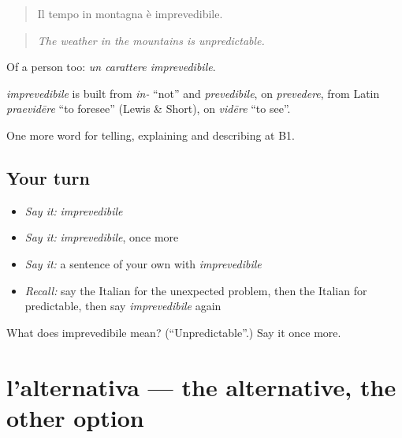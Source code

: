 \begin{quote}
Il tempo in montagna è imprevedibile.
\end{quote}

\begin{quote}
\emph{The weather in the mountains is unpredictable.}
\end{quote}

Of a person too: \emph{un carattere imprevedibile}.

\begin{cousinweb}
\emph{imprevedibile} is built from \emph{in-} \textquotedblleft{}not\textquotedblright{} and \emph{prevedibile}, on \emph{prevedere}, from Latin \emph{praevidēre} \textquotedblleft{}to foresee\textquotedblright{} (Lewis \& Short), on \emph{vidēre} \textquotedblleft{}to see\textquotedblright{}.
\end{cousinweb}

\begin{grammarlens}[title={What you've built}]
One more word for telling, explaining and describing at B1.
\end{grammarlens}

\subsection*{Your turn}
\begin{itemize}
\raggedright
  \item \emph{Say it:} \emph{imprevedibile}
  \item \emph{Say it:} \emph{imprevedibile}, once more
  \item \emph{Say it:} a sentence of your own with \emph{imprevedibile}
  \item \emph{Recall:} say the Italian for the unexpected problem, then the Italian for predictable, then say \emph{imprevedibile} again
\end{itemize}

\begin{tcolorbox}[breakable,colback=teal!4,colframe=teal!35!black,title={Before you move on}]
What does imprevedibile mean? (\textquotedblleft{}Unpredictable\textquotedblright{}.) Say it once more.
\end{tcolorbox}
\section[l'alternativa]{l'alternativa — the alternative, the other option}

\label{lesson:IT-C374-alternativa}



